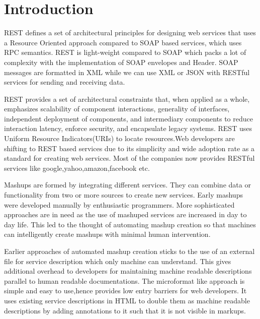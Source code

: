 \documentclass[journal]{IEEEtran}
\begin{document}
%
\IEEEpeerreviewmaketitle



\section{Introduction}

REST defines a set of architectural principles for designing web services that uses a Resource Oriented approach compared to SOAP based services, which uses RPC semantics. REST is light-weight compared to SOAP which packs a lot of complexity with the implementation of SOAP envelopes and Header. SOAP messages are formatted in XML while we can use XML or JSON with RESTful services for sending and receiving data. 

REST provides a set of architectural constraints that, when applied as a whole, emphasizes scalability of component interactions, generality of interfaces, independent deployment of components, and intermediary components to reduce interaction latency, enforce security, and encapsulate legacy systems. REST uses Uniform Resource Indicators(URIs) to locate resources.Web developers are shifting to REST based services due to its simplicity and wide adoption rate as a standard for creating web services. Most of the companies now provides RESTful services like google,yahoo,amazon,facebook etc.

Mashups are formed by integrating  different services. They can combine data or functionality from two or more sources to create  new services. Early mashups were developed manually by enthusiastic programmers. More sophisticated approaches are in need as the use of mashuped services are increased in day to day life. This led to the thought of automating mashup creation so that machines can intelligently create mashups with minimal human intervention.

Earlier approaches of automated mashup creation sticks to the use of an external file for service description which only machine can understand. This gives additional overhead to developers for maintaining machine readable descriptions parallel to human readable documentations. The microformat \cite{microformat} like approach is simple and easy to use,hence provides low entry barriers for web developers. It uses existing service descriptions in HTML to double them as machine readable descriptions by adding annotations to it such that it is not visible in markups.
\end{document}
